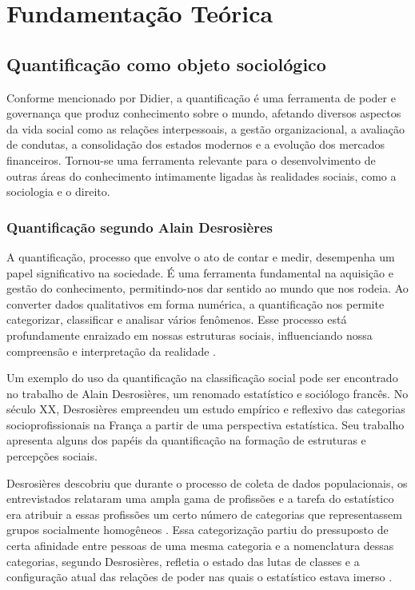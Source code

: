 
\chapter{Fundamentação Teórica}
\label{chapfundamentacaoteorica}

\section{Quantificação como objeto sociológico}

Conforme mencionado por Didier, a quantificação é uma ferramenta de poder e governança que produz conhecimento sobre o mundo, afetando diversos aspectos da vida social como as relações interpessoais, a gestão organizacional, a avaliação de condutas, a consolidação dos estados modernos e a evolução dos mercados financeiros. Tornou-se uma ferramenta relevante para o desenvolvimento de outras áreas do conhecimento intimamente ligadas às realidades sociais, como a sociologia e o direito.

\subsection{Quantificação segundo Alain Desrosières}

A quantificação, processo que envolve o ato de contar e medir, desempenha um papel significativo na sociedade. É uma ferramenta fundamental na aquisição e gestão do conhecimento, permitindo-nos dar sentido ao mundo que nos rodeia. Ao converter dados qualitativos em forma numérica, a quantificação nos permite categorizar, classificar e analisar vários fenômenos. Esse processo está profundamente enraizado em nossas estruturas sociais, influenciando nossa compreensão e interpretação da realidade \cite{boltanski2011critique}.

Um exemplo do uso da quantificação na classificação social pode ser encontrado no trabalho de Alain Desrosières, um renomado estatístico e sociólogo francês. No século XX, Desrosières empreendeu um estudo empírico e reflexivo das categorias socioprofissionais na França a partir de uma perspectiva estatística. Seu trabalho apresenta alguns dos papéis da quantificação na formação de estruturas e percepções sociais.

Desrosières descobriu que durante o processo de coleta de dados populacionais, os entrevistados relataram uma ampla gama de profissões e a tarefa do estatístico era atribuir a essas profissões um certo número de categorias que representassem grupos socialmente homogêneos \cite{desrosieres2016quantification}. Essa categorização partiu do pressuposto de certa afinidade entre pessoas de uma mesma categoria e a nomenclatura dessas categorias, segundo Desrosières, refletia o estado das lutas de classes e a configuração atual das relações de poder nas quais o estatístico estava imerso \cite{camargo2009sociologia}.

